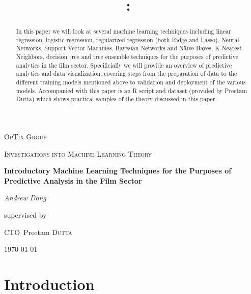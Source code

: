 \documentclass{article}
\title{\vspace{2in}\textmd{\textbf{\hmwkClass:\ \hmwkTitle}}\\\normalsize\vspace{0.1in}\vspace{0.1in}\large{\textit{\hmwkClassInstructor}}\vspace{3in}}
\date{}
\author{\textbf{\hmwkAuthorName}}
\begin{document}
\begin{spacing}{1.1}
\newpage


\clearpage

\begin{titlepage}
	\centering
	{\scshape\LARGE OpTix Group \par}
	\vspace{1cm}
	{\scshape\Large Investigations into Machine Learning Theory\par}
	\vspace{1.5cm}
	{\huge\bfseries Introductory Machine Learning Techniques for the Purposes of Predictive Analysis in the Film Sector\par}
	\vspace{1cm}
	{\Large\itshape Andrew Dong\par}
	\vspace{2cm}
	\begin{abstract}
In this paper we will look at several machine learning techniques including linear regression, logistic regression, regularized regression (both Ridge and Lasso), Neural Networks, Support Vector Machines, Bayesian Networks and N{\"a}ive Bayes, K-Nearest Neighbors, decision tree and tree ensemble techniques for the purposes of predictive analytics in the film sector.  Specificially we will provide an overview of predictive analytics and data visualization, covering steps from the preparation of data to the different training models mentioned above to validation and deployment of the various models.  Accompanied with this paper is an R script and dataset (provided by Preetam Dutta) which shows practical samples of the theory discussed in this paper.  
\end{abstract}
	\vfill


	supervised by\par
	CTO~Preetam \textsc{Dutta}
	\vspace{5 mm}
	\\{\large \today\par}
\end{titlepage}

\section{Introduction}


\end{spacing}
\end{document}

